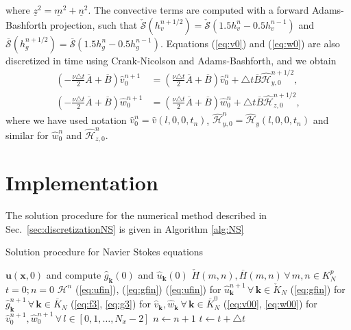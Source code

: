 \documentclass[11pt, oneside]{article}
\newcommand{\N}[1]{\check{#1}}
\newcommand{\D}[1]{\overline{#1}}
\begin{document}
where $\underline{z}^2 = \underline{m}^2 + \underline{n}^2$. The convective 
terms are computed with a forward Adams-Bashforth projection, such that 
$\N{\mathcal{S}}(h_v^{n+1/2}) = 
\N{\mathcal{S}}(1.5h_v^{n} - 0.5 h_v^{n-1})$ and $\D{\mathcal{S}}(h_g^{n+1/2}) 
= \D{\mathcal{S}}(1.5h_g^{n} - 0.5 h_g^{n-1})$. Equations 
(\ref{eq:v0}) and (\ref{eq:w0}) are also discretized in time using 
Crank-Nicolson and Adams-Bashforth, and we obtain
\begin{align}
\left(-\frac{\nu \triangle t}{2}\D{A} + \D{B} \right)\hat{v}_0^{n+1} &= 
\left(\frac{\nu \triangle t}{2}\D{A} + \D{B} 
\right)\hat{v}^{n}_0 + \triangle t\D{B}\hat{\mathcal{H}}_{y,0}^{n+1/2} , 
\label{eq:v00} \\
\left(-\frac{\nu \triangle t}{2}\D{A} + \D{B} \right)\hat{w}_0^{n+1} &= 
\left(\frac{\nu \triangle t}{2}\D{A} + \D{B} 
\right)\hat{w}^{n}_0 + \triangle t\D{B}\hat{\mathcal{H}}_{z,0}^{n+1/2}, 
\label{eq:w00}
\end{align}
where we have used notation $\hat{v}^{n}_0 = \hat{v}(l, 0, 0, t_n)$, 
$\hat{\mathcal{H}}^{n}_{y,0} = \hat{\mathcal{H}}_y(l, 0, 0, t_n)$ and similar 
for $\hat{w}^n_0$ and $\hat{\mathcal{H}}^n_{z,0}$.

\section{Implementation}
\label{sec:implementation}
The solution procedure for the numerical method described in 
Sec.~\ref{sec:discretizationNS} is given in Algorithm \ref{alg:NS}

\begin{algorithm}
	\caption{Solution procedure for Navier Stokes equations}
    \label{alg:NS}
    \begin{algorithmic}[1]
    	\State {} $\bm{u}(\bm{x}, 0)$ and compute 
    	$\hat{g}_{\bm{k}}(0)$ and $\hat{u}_{\bm{k}}(0)$
		\State {} $\N{H}(m,n), \D{H}(m,n) 
		\,\forall \, m, n \in K_N^p$
		\State $t=0; n=0$
	    	\State {} $\bm{\mathcal{H}}^n$
	    	\State {}(\ref{eq:ufin}), 
	    	(\ref{eq:gfin})
		    \State {}(\ref{eq:ufin}) for 
		    $\hat{u}^{n+1}_{\bm{k}} \, \forall \,\bm{k} \in \N{K}_N$
		    \State {}(\ref{eq:gfin}) for 
		    $\hat{g}^{n+1}_{\bm{k}} \, \forall\, \bm{k} \in \D{K}_N$
		    \State {}(\ref{eq:f3}, \ref{eq:g3}) for  
		    $\hat{v}_{\bm{k}}, \hat{w}_{\bm{k}}\, \forall\, \bm{k} 
		    \in \D{K}_N^0$
		    \State {}(\ref{eq:v00}, \ref{eq:w00}) for 
		    $\hat{v}_0^{n+1}, \hat{w}_0^{n+1}\, 
		    \forall \, l \in [0, 1, \ldots, N_x-2] $
		    \State $n \gets n + 1$
		    \State $t \gets t+\triangle t$
		    \State {}
	    \EndWhile 
	    	
    \end{algorithmic}
\end{algorithm}
\end{document}
